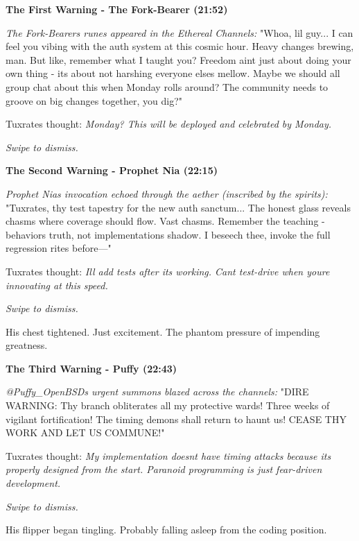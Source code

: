 \textbf{The First Warning - The Fork-Bearer (21:52)}

\emph{The Fork-Bearer\textquotesingle s runes appeared in the Ethereal Channels:} "Whoa, lil\textquotesingle{} guy... I can feel you vibing with the auth system at this cosmic hour. Heavy changes brewing, man. But like, remember what I taught you? Freedom ain\textquotesingle t just about doing your own thing - it\textquotesingle s about not harshing everyone else\textquotesingle s mellow. Maybe we should all group chat about this when Monday rolls around? The community needs to groove on big changes together, you dig?"

Tuxrates\textquotesingle{} thought: \emph{Monday? This will be deployed and celebrated by Monday.}

\emph{Swipe to dismiss.}

\textbf{The Second Warning - Prophet Nia (22:15)}

\emph{Prophet Nia\textquotesingle s invocation echoed through the aether (inscribed by the spirits):} "Tuxrates, thy test tapestry for the new auth sanctum... The honest glass reveals chasms where coverage should flow. Vast chasms. Remember the teaching - behavior\textquotesingle s truth, not implementation\textquotesingle s shadow. I beseech thee, invoke the full regression rites before---"

Tuxrates\textquotesingle{} thought: \emph{I\textquotesingle ll add tests after it\textquotesingle s working. Can\textquotesingle t test-drive when you\textquotesingle re innovating at this speed.}

\emph{Swipe to dismiss.}

His chest tightened. Just excitement. The phantom pressure of impending greatness.

\textbf{The Third Warning - Puffy (22:43)}

\emph{@Puffy\_OpenBSD\textquotesingle s urgent summons blazed across the channels:} "DIRE WARNING: Thy branch obliterates all my protective wards! Three weeks of vigilant fortification! The timing demons shall return to haunt us! CEASE THY WORK AND LET US COMMUNE!"

Tuxrates\textquotesingle{} thought: \emph{My implementation doesn\textquotesingle t have timing attacks because it\textquotesingle s properly designed from the start. Paranoid programming is just fear-driven development.}

\emph{Swipe to dismiss.}

His flipper began tingling. Probably falling asleep from the coding position.

